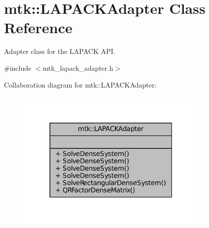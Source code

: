 \hypertarget{classmtk_1_1LAPACKAdapter}{\section{mtk\+:\+:L\+A\+P\+A\+C\+K\+Adapter Class Reference}
\label{classmtk_1_1LAPACKAdapter}
}


Adapter class for the L\+A\+P\+A\+C\+K A\+P\+I.  




{\ttfamily \#include $<$mtk\+\_\+lapack\+\_\+adapter.\+h$>$}



Collaboration diagram for mtk\+:\+:L\+A\+P\+A\+C\+K\+Adapter\+:
\nopagebreak
\begin{figure}[H]
\begin{center}
\leavevmode
\includegraphics[width=265pt]{classmtk_1_1LAPACKAdapter__coll__graph}
\end{center}
\end{figure}
